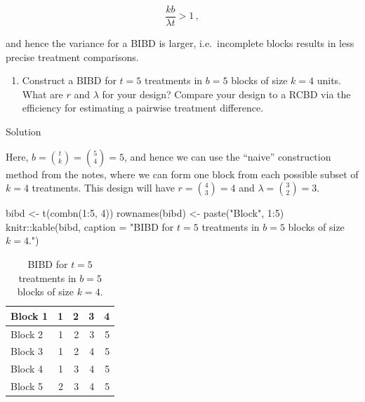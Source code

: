 \documentclass[
]{book}
\newenvironment{Shaded}{\begin{snugshade}}{\end{snugshade}}
\newcommand{\AttributeTok}[1]{\textcolor[rgb]{0.77,0.63,0.00}{#1}}
\newcommand{\DecValTok}[1]{\textcolor[rgb]{0.00,0.00,0.81}{#1}}
\newcommand{\FunctionTok}[1]{\textcolor[rgb]{0.00,0.00,0.00}{#1}}
\newcommand{\NormalTok}[1]{#1}
\newcommand{\OtherTok}[1]{\textcolor[rgb]{0.56,0.35,0.01}{#1}}
\newcommand{\SpecialCharTok}[1]{\textcolor[rgb]{0.00,0.00,0.00}{#1}}
\newcommand{\StringTok}[1]{\textcolor[rgb]{0.31,0.60,0.02}{#1}}
\providecommand{\tightlist}{%
  \setlength{\itemsep}{0pt}\setlength{\parskip}{0pt}}
\theoremstyle{definition}
\theoremstyle{definition}
\theoremstyle{definition}
\theoremstyle{definition}
\theoremstyle{remark}
\begin{document}
\[
\frac{kb}{\lambda t} > 1\,,
\]

and hence the variance for a BIBD is larger, i.e.~incomplete blocks results in less precise treatment comparisons.

\begin{enumerate}
\def\labelenumi{\arabic{enumi}.}
\setcounter{enumi}{3}
\tightlist
\item
  Construct a BIBD for \(t=5\) treatments in \(b=5\) blocks of size \(k=4\) units. What are \(r\) and \(\lambda\) for your design? Compare your design to a RCBD via the efficiency for estimating a pairwise treatment difference.
\end{enumerate}

Solution

Here, \(b = {t \choose k} = {5 \choose 4} = 5\), and hence we can use the ``naive'' construction method from the notes, where we can form one block from each possible subset of \(k=4\) treatments. This design will have \(r = {4 \choose 3} = 4\) and \(\lambda = {3 \choose 2} = 3\).

\begin{Shaded}
\begin{Highlighting}[]
\NormalTok{bibd }\OtherTok{\textless{}{-}} \FunctionTok{t}\NormalTok{(}\FunctionTok{combn}\NormalTok{(}\DecValTok{1}\SpecialCharTok{:}\DecValTok{5}\NormalTok{, }\DecValTok{4}\NormalTok{))}
\FunctionTok{rownames}\NormalTok{(bibd) }\OtherTok{\textless{}{-}} \FunctionTok{paste}\NormalTok{(}\StringTok{"Block"}\NormalTok{, }\DecValTok{1}\SpecialCharTok{:}\DecValTok{5}\NormalTok{)}
\NormalTok{knitr}\SpecialCharTok{::}\FunctionTok{kable}\NormalTok{(bibd, }\AttributeTok{caption =} \StringTok{"BIBD for $t = 5$ treatments in $b=5$ blocks of size $k=4$."}\NormalTok{)}
\end{Highlighting}
\end{Shaded}

\begin{table}

\caption{\label{tab:naive-bibd-construction}BIBD for $t = 5$ treatments in $b=5$ blocks of size $k=4$.}
\centering
\begin{tabular}[t]{l|r|r|r|r}
\hline
Block 1 & 1 & 2 & 3 & 4\\
\hline
Block 2 & 1 & 2 & 3 & 5\\
\hline
Block 3 & 1 & 2 & 4 & 5\\
\hline
Block 4 & 1 & 3 & 4 & 5\\
\hline
Block 5 & 2 & 3 & 4 & 5\\
\hline
\end{tabular}
\end{table}
\end{document}
